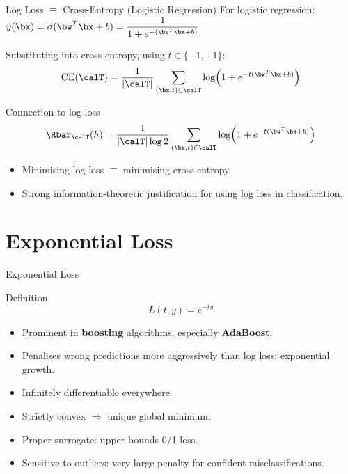 \begin{frame}{Log Loss $\equiv$ Cross-Entropy (Logistic Regression)}
  For logistic regression:
  $y(\bx) = \sigma(\bw^T\bx+b) = \dfrac{1}{1+e^{-(\bw^T\bx+b)}}$
  \smallskip

  Substituting into cross-entropy, using $t\in\{-1,+1\}$:
  \[
    \mathrm{CE}(\calT)
    = \frac{1}{|\calT|}\sum_{(\bx,t)\in\calT}
      \log\!\left(1+e^{-t(\bw^T\bx+b)}\right)
  \]
  \begin{block}{Connection to log loss}
    \[
      \Rbar_{\calT}(h)
      = \frac{1}{|\calT|\log 2}
        \sum_{(\bx,t)\in\calT}
        \log\!\left(1+e^{-t(\bw^T\bx+b)}\right)
    \]
  \end{block}
  \begin{itemize}
    \item Minimising log loss $\equiv$ minimising cross-entropy.
    \item Strong information-theoretic justification for using log loss in classification.
  \end{itemize}
\end{frame}

\section{Exponential Loss}

\begin{frame}{Exponential Loss}
  \begin{block}{Definition}
    \[ L(t,y) = e^{-ty} \]
  \end{block}
  \begin{itemize}
    \item Prominent in \textbf{boosting} algorithms, especially \textbf{AdaBoost}.
    \item Penalises wrong predictions more aggressively than log loss: exponential growth.
    \item Infinitely differentiable everywhere.
    \item Strictly convex $\Rightarrow$ unique global minimum.
    \item Proper surrogate: upper-bounds 0/1 loss.
    \item \textcolor{AlertRed}{Sensitive to outliers}: very large penalty for confident misclassifications.
  \end{itemize}
\end{frame}

